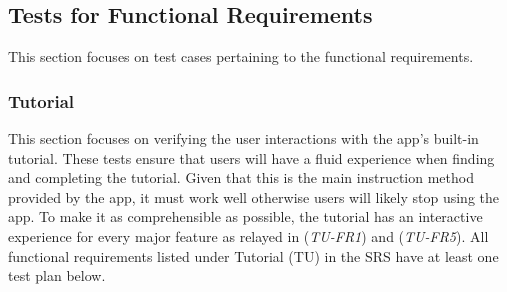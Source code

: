 \documentclass[12pt, titlepage]{article}
\begin{document}
\subsection{Tests for Functional Requirements}
This section focuses on test cases pertaining to the functional requirements.

\subsubsection{Tutorial}

This section focuses on verifying the user interactions with the app's built-in tutorial. These tests ensure that users will have a fluid experience when finding and completing the tutorial. Given that this is the main instruction method provided by the app, it must work well otherwise users will likely stop using the app. To make it as comprehensible as possible, the tutorial has an interactive experience for every major feature as relayed in (\textit{TU-FR1}) and (\textit{TU-FR5}).  All functional requirements listed under Tutorial (TU) in the SRS \cite{SRS} have at least one test plan below.
\end{document}

